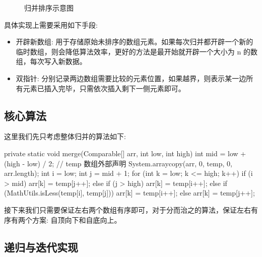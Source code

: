 \begin{figure}[H]
    \caption{归并排序示意图}
    \label{fig:归并排序示意图}
\end{figure}

具体实现上需要采用如下手段:
\begin{itemize}
  \item 开辟新数组: 用于存储原始未排序的数组元素。如果每次归并都开辟一个新的临时数组，则会降低算法效率，更好的方法是最开始就开辟一个大小为 n 的数组，每次写入新数据。
  \item 双指针: 分别记录两边数组需要比较的元素位置，如果越界，则表示某一边所有元素已插入完毕，只需依次插入剩下一侧元素即可。
\end{itemize}

\subsection{核心算法}

这里我们先只考虑整体归并的算法如下:

\begin{Java}
private static void merge(Comparable[] arr, int low, int high) {
    int mid = low + (high - low) / 2;
    // temp 数组外部声明
    System.arraycopy(arr, 0, temp, 0, arr.length);
    int i = low;
    int j = mid + 1;
    for (int k = low; k <= high; k++) {
        if (i > mid) arr[k] = temp[j++];
        else if (j > high) arr[k] = temp[i++];
        else if (MathUtils.isLess(temp[i], temp[j]))
            arr[k] = temp[i++];
        else
            arr[k] = temp[j++];
    }
}
\end{Java}

接下来我们只需要保证左右两个数组有序即可，对于分而治之的算法，保证左右有序有两个方案: 自顶向下和自底向上。

\subsection{递归与迭代实现}

